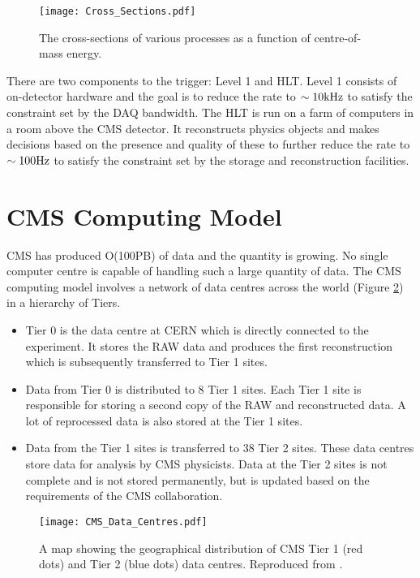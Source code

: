 \begin{figure}
\begin{center}
\texttt{[image: Cross\_Sections.pdf]}
\end{center}
\caption{The cross-sections of various processes as a function of centre-of-mass
energy.}
\label{fig:cross_sections}
\end{figure}

There are two components to the trigger: Level 1 and HLT. Level 1 consists of
on-detector hardware and the goal is to reduce the rate to $\sim 10\mbox{kHz}$ to
satisfy the constraint set by the DAQ bandwidth. The HLT is run on a farm of 
computers in a room above the CMS detector. It reconstructs physics objects 
and makes decisions based on the presence and quality of these to further reduce
the rate to $\sim 100\mbox{Hz}$ to satisfy the constraint set by the storage and 
reconstruction facilities.

\section{CMS Computing Model}

CMS has produced O(100PB) of data and the quantity is growing. No single computer
centre is capable of handling such a large quantity of data. The CMS computing
model involves a network of data centres across the world (Figure 
\ref{fig:CMS_Data_Centres}) in a hierarchy of Tiers. 

\begin{itemize}
\item Tier 0 is the data centre at CERN which is directly connected to the
experiment. It stores the RAW data and produces the first reconstruction which
is subsequently transferred to Tier 1 sites. 
\item Data from Tier 0 is distributed to 8 Tier 1 sites. Each Tier 1 site is 
responsible for storing a second copy of the RAW and reconstructed data. A lot 
of reprocessed data is also stored at the Tier 1 sites. 
\item Data from the Tier 1 sites is transferred to 38 Tier 2 sites. These data
centres store data for analysis by CMS physicists. Data at the Tier 2 sites is
not complete and is not stored permanently, but is updated based on the
requirements of the CMS collaboration. 
\end{itemize}

\begin{figure}
\texttt{[image: CMS\_Data\_Centres.pdf]}
\caption{A map showing the geographical distribution of CMS Tier 1 (red dots)
and Tier 2 (blue dots) data centres. Reproduced from \cite{grid}.}
\label{fig:CMS_Data_Centres}
\end{figure}

